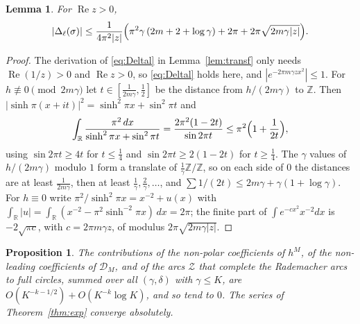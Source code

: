 \documentclass[11pt]{amsart}
\numberwithin{equation}{section}
\theoremstyle{plain}
\newtheorem{lem}[thm]{Lemma}
\newtheorem{prop}[thm]{Proposition}
\theoremstyle{definition}
\theoremstyle{remark}
\newcommand{\Z}{\mathbb{Z}}
\newcommand{\R}{\mathbb{R}}
\begin{document}
\begin{lem}\label{lem:Dbound}
For $\operatorname{Re}z>0$,
\[
|\Delta_\ell(\sigma)|\le\frac{1}{4\pi^2|z|}\Bigl(\pi^2\gamma\,(2m+2+\log\gamma)+2\pi+2\pi\sqrt{2m\gamma|z|}\Bigr).
\]
\end{lem}

\begin{proof}
The derivation of \eqref{eq:Deltal} in Lemma~\ref{lem:transf} only needs $\operatorname{Re}(1/z)>0$ and $\operatorname{Re}z>0$, so \eqref{eq:Deltal} holds here, and $|e^{-2\pi m\gamma zx^2}|\le1$. For $h\not\equiv0\pmod{2m\gamma}$ let $t\in[\frac1{2m\gamma},\frac12]$ be the distance from $h/(2m\gamma)$ to $\Z$. Then $|\sinh\pi(x+it)|^2=\sinh^2\pi x+\sin^2\pi t$ and
\[
\int_\R\frac{\pi^2\,dx}{\sinh^2\pi x+\sin^2\pi t}=\frac{2\pi^2(1-2t)}{\sin2\pi t}\le\pi^2\Bigl(1+\frac1{2t}\Bigr),
\]
using $\sin2\pi t\ge4t$ for $t\le\frac14$ and $\sin2\pi t\ge2(1-2t)$ for $t\ge\frac14$. The $\gamma$ values of $h/(2m\gamma)$ modulo $1$ form a translate of $\frac1\gamma\Z/\Z$, so on each side of $0$ the distances are at least $\frac1{2m\gamma}$, then at least $\frac1\gamma,\frac2\gamma,\dots$, and $\sum1/(2t)\le2m\gamma+\gamma(1+\log\gamma)$. For $h\equiv0$ write $\pi^2/\sinh^2\pi x=x^{-2}+u(x)$ with $\int_\R|u|=\int_\R(x^{-2}-\pi^2\sinh^{-2}\pi x)\,dx=2\pi$; the finite part of $\int e^{-cx^2}x^{-2}dx$ is $-2\sqrt{\pi c}$, with $c=2\pi m\gamma z$, of modulus $2\pi\sqrt{2m\gamma|z|}$.
\end{proof}

\begin{prop}\label{prop:remainders}
The contributions of the non-polar coefficients of $h^M$, of the non-leading coefficients of $\mathcal D_M$, and of the arcs $\mathcal Z$ that complete the Rademacher arcs to full circles, summed over all $(\gamma,\delta)$ with $\gamma\le K$, are $O(K^{-k-1/2})+O(K^{-k}\log K)$, and so tend to $0$. The series of Theorem~\ref{thm:exp} converge absolutely.
\end{prop}
\end{document}
